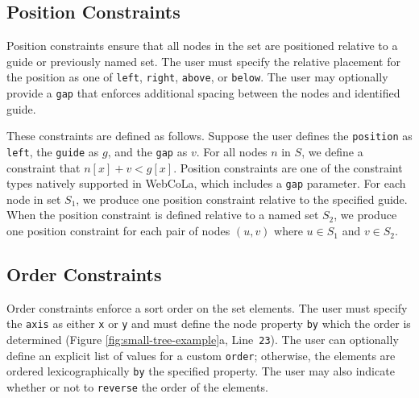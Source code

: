 
\subsection{Position Constraints}
Position constraints ensure that all nodes in the set are positioned relative to
a guide or previously named set. The user must specify the relative
placement for the position as one of \texttt{left}, \texttt{right}, 
\texttt{above}, or \texttt{below}.
The user may optionally provide a \texttt{gap} that enforces additional spacing
between the nodes and identified guide.

These constraints are defined as follows. Suppose the user defines the
\texttt{position} as \texttt{left},
the \texttt{guide} as $g$, and the \texttt{gap} as $v$. For all nodes $n$
in $S$, we define a constraint that \mbox{$n[x] + v < g[x]$}.
Position constraints are one of the constraint types natively supported in
WebCoLa, which includes a \texttt{gap} parameter. For each node
in set $S_1$, we produce one position constraint relative to the specified guide.
When the position constraint is defined relative to a named set $S_2$,
we produce one position constraint for each pair of nodes $(u, v)$ where $u \in S_1$ and $v \in S_2$.



\subsection{Order Constraints}
Order constraints enforce a sort order on the set elements. The user must 
specify the \texttt{axis} as either \texttt{x} or \texttt{y} and must define
the node property \texttt{by} which the order is determined 
(Figure \ref{fig:small-tree-example}a, Line~\texttt{23}). 
The user can optionally define an explicit list of values for a custom
\texttt{order}; otherwise, the elements are ordered lexicographically \texttt{by}
the specified property. The user may also indicate whether
or not to \texttt{reverse} the order of the elements.

